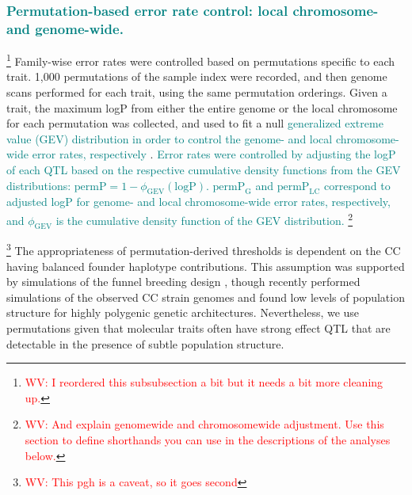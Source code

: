 \documentclass[9pt,twocolumn,twoside]{gsajnl}
\newcommand{\permplc}{\text{permP}_{\text{LC}}}
\newcommand{\permpg}{\text{permP}_{\text{G}}}
\newcommand{\WV}[2]{\textcolor{red}{#1\footnote{\textcolor{red}{WV: #2}}}}
\newcommand{\GKinline}[1]{\textcolor{teal}{#1}}
\begin{document}
\subsubsection{\GKinline{Permutation-based error rate control: local chromosome- and genome-wide.}}

\WV{}{I reordered this subsubsection a bit but it needs a bit more cleaning up.} 
Family-wise error rates were controlled based on permutations specific to each trait. 1,000 permutations of the sample index were recorded, and then genome scans performed for each trait, using the same permutation orderings. Given a trait, the maximum logP from either the entire genome or the local chromosome for each permutation was collected, and used to fit a null \GKinline{generalized extreme value (GEV) distribution \GKinline{in order to control the genome- and local chromosome-wide error rates, respectively}} \citep{Dudbridge2004}. 
\GKinline{Error rates were controlled by adjusting the logP of each QTL based on the respective cumulative density functions from the GEV distributions: $\text{permP} = 1 - \phi_{\text{GEV}}(\text{logP})$. $\permpg$ and $\permplc$ correspond to adjusted logP for genome- and local chromosome-wide error rates, respectively, and $\phi_{\text{GEV}}$ is the cumulative density function of the GEV distribution.}
\WV{}{And explain genomewide and chromosomewide adjustment. Use this section to define shorthands you can use in the descriptions of the analyses below.}

\WV{}{This pgh is a caveat, so it goes second} The appropriateness of permutation-derived thresholds \citep{Doerge1996} is dependent on the CC having balanced founder haplotype contributions. This assumption was supported by simulations of the funnel breeding design \citep{Valdar2006c}, though recently \cite{Keele2019} performed simulations of the observed CC strain genomes and found low levels of population structure for highly polygenic genetic architectures. Nevertheless, we use permutations given that molecular traits often have strong effect QTL that are detectable in the presence of subtle population structure.
\end{document}
